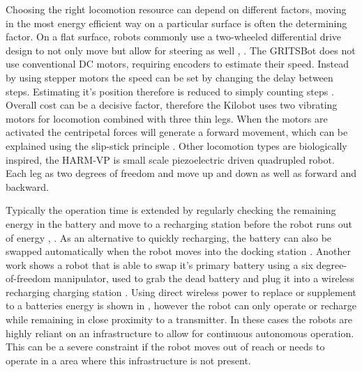 \documentclass[letterpaper, 10 pt, conference]{ieeeconf}  %
\begin{document}
Choosing the right locomotion resource can depend on different factors, moving in the most energy efficient way on a particular surface is often the determining factor.
On a flat surface, robots commonly use a two-wheeled differential drive design to not only move but allow for steering as well \cite{sabelhaus_icra_2013}, \cite{pickem_icra_2015}.
The GRITSBot does not use conventional DC motors, requiring encoders to estimate their speed. 
Instead by using stepper motors the speed can be set by changing the delay between steps. 
Estimating it's position therefore is reduced to simply counting steps \cite{pickem_icra_2015}.  
Overall cost can be a decisive factor, therefore the Kilobot uses two vibrating motors for locomotion combined with three thin legs.
When the motors are activated the centripetal forces will generate a forward movement, which can be explained using the slip-stick principle \cite{rubenstein_icra_2012}.
Other locomotion types are biologically inspired, the HARM-VP is small scale piezoelectric driven quadrupled robot\cite{baisch_iros_2013}.
Each leg as two degrees of freedom and move up and down as well as forward and backward.


Typically the operation time is extended by regularly checking the remaining energy in the battery and move to a recharging station before the robot runs out of energy \cite{pickem_icra_2015}, \cite{rubenstein_icra_2012}.
As an alternative to quickly recharging, the battery can also be swapped automatically when the robot moves into the docking station \cite{kemal_mech_2015}.
Another work shows a robot that is able to swap it's primary battery using a six degree-of-freedom manipulator, used to grab the dead battery and plug it into a wireless recharging charging station \cite{zhang_conel_2013}.
Using direct wireless power to replace or supplement to a batteries energy is shown in \cite{karpelson_icra_2014}, however the robot can only operate or recharge while remaining in close proximity to a transmitter. 
In these cases the robots are highly reliant on an infrastructure to allow for continuous autonomous operation.
This can be a severe constraint if the robot moves out of reach or needs to operate in a area where this infrastructure is not present.

\end{document}
